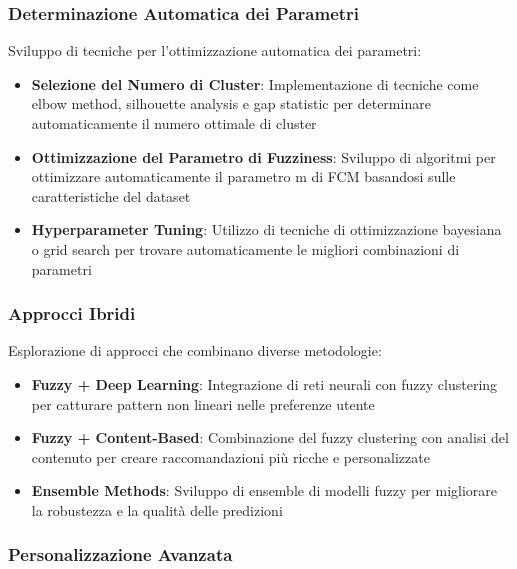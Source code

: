 \subsubsection{Determinazione Automatica dei Parametri}

Sviluppo di tecniche per l'ottimizzazione automatica dei parametri:

\begin{itemize}
    \item \textbf{Selezione del Numero di Cluster}: Implementazione di tecniche come elbow method, silhouette analysis e gap statistic per determinare automaticamente il numero ottimale di cluster
    
    \item \textbf{Ottimizzazione del Parametro di Fuzziness}: Sviluppo di algoritmi per ottimizzare automaticamente il parametro m di FCM basandosi sulle caratteristiche del dataset
    
    \item \textbf{Hyperparameter Tuning}: Utilizzo di tecniche di ottimizzazione bayesiana o grid search per trovare automaticamente le migliori combinazioni di parametri
\end{itemize}

\subsubsection{Approcci Ibridi}

Esplorazione di approcci che combinano diverse metodologie:

\begin{itemize}
    \item \textbf{Fuzzy + Deep Learning}: Integrazione di reti neurali con fuzzy clustering per catturare pattern non lineari nelle preferenze utente
    
    \item \textbf{Fuzzy + Content-Based}: Combinazione del fuzzy clustering con analisi del contenuto per creare raccomandazioni più ricche e personalizzate
    
    \item \textbf{Ensemble Methods}: Sviluppo di ensemble di modelli fuzzy per migliorare la robustezza e la qualità delle predizioni
\end{itemize}

\subsubsection{Personalizzazione Avanzata}

